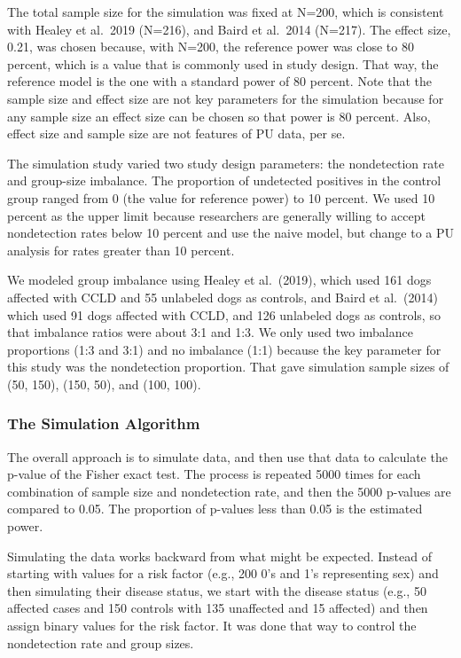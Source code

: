 \documentclass[
]{article}
\begin{document}
The total sample size for the simulation was fixed at N=200, which is
consistent with Healey et al.~2019 (N=216), and Baird et al.~2014
(N=217). \cite{bcioa14, hmhcbhkr19} The effect size, 0.21, was chosen
because, with N=200, the reference power was close to 80 percent, which
is a value that is commonly used in study design. That way, the
reference model is the one with a standard power of 80 percent. Note
that the sample size and effect size are not key parameters for the
simulation because for any sample size an effect size can be chosen so
that power is 80 percent. Also, effect size and sample size are not
features of PU data, per se.

The simulation study varied two study design parameters: the
nondetection rate and group-size imbalance. The proportion of undetected
positives in the control group ranged from 0 (the value for reference
power) to 10 percent. We used 10 percent as the upper limit because
researchers are generally willing to accept nondetection rates below 10
percent and use the naive model, but change to a PU analysis for rates
greater than 10 percent. \cite{bd20}

We modeled group imbalance using Healey et al.~(2019), which used 161
dogs affected with CCLD and 55 unlabeled dogs as controls, and Baird et
al.~(2014) which used 91 dogs affected with CCLD, and 126 unlabeled dogs
as controls, so that imbalance ratios were about 3:1 and 1:3.
\cite{bcioa14} \cite{hmhcbhkr19} We only used two imbalance proportions
(1:3 and 3:1) and no imbalance (1:1) because the key parameter for this
study was the nondetection proportion. That gave simulation sample sizes
of (50, 150), (150, 50), and (100, 100).

\pagebreak

\hypertarget{the-simulation-algorithm}{%
\subsubsection{The Simulation
Algorithm}\label{the-simulation-algorithm}}

The overall approach is to simulate data, and then use that data to
calculate the p-value of the Fisher exact test. The process is repeated
5000 times for each combination of sample size and nondetection rate,
and then the 5000 p-values are compared to 0.05. The proportion of
p-values less than 0.05 is the estimated power.

Simulating the data works backward from what might be expected. Instead
of starting with values for a risk factor (e.g., 200 0's and 1's
representing sex) and then simulating their disease status, we start
with the disease status (e.g., 50 affected cases and 150 controls with
135 unaffected and 15 affected) and then assign binary values for the
risk factor. It was done that way to control the nondetection rate and
group sizes.
\end{document}
